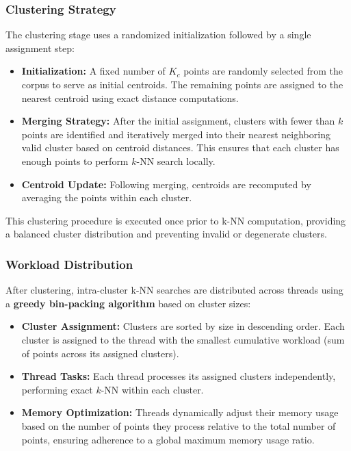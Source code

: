 \documentclass{article}
\begin{document}
\subsubsection{Clustering Strategy}

The clustering stage uses a randomized initialization followed by a single assignment step:
\begin{itemize}
    \item \textbf{Initialization:} A fixed number of $K_c$ points are randomly selected from the corpus 
    to serve as initial centroids. The remaining points are assigned to the nearest centroid using exact 
    distance computations.
    \item \textbf{Merging Strategy:} After the initial assignment, clusters with fewer than $k$ points 
    are identified and iteratively merged into their nearest neighboring valid cluster based on centroid 
    distances. This ensures that each cluster has enough points to perform $k$-NN search locally.
    \item \textbf{Centroid Update:} Following merging, centroids are recomputed by averaging the points 
    within each cluster.
\end{itemize}

This clustering procedure is executed once prior to k-NN computation, providing a balanced cluster 
distribution and preventing invalid or degenerate clusters.

\subsubsection{Workload Distribution}

After clustering, intra-cluster k-NN searches are distributed across threads using a 
\textbf{greedy bin-packing algorithm} based on cluster sizes:
\begin{itemize}
    \item \textbf{Cluster Assignment:} Clusters are sorted by size in descending order. Each cluster is 
    assigned to the thread with the smallest cumulative workload (sum of points across its assigned clusters).
    \item \textbf{Thread Tasks:} Each thread processes its assigned clusters independently, performing exact 
    $k$-NN within each cluster.
    \item \textbf{Memory Optimization:} Threads dynamically adjust their memory usage based on the number of 
    points they process relative to the total number of points, ensuring adherence to a global maximum memory 
    usage ratio.
\end{itemize}
\end{document}
